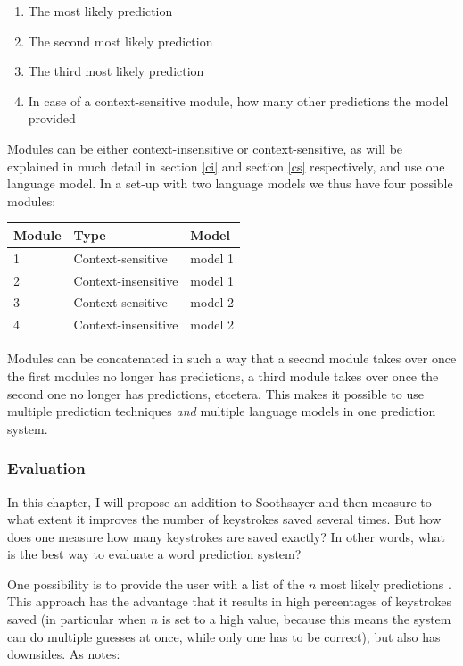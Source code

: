 \documentclass[12pt]{article}
\let\originaltable\table
\let\endoriginaltable\endtable
\renewenvironment{table}[1][ht]{%
  \originaltable[#1]
  \centering}%
  {\endoriginaltable}
\begin{document}
\begin{enumerate}
\item The most likely prediction
\item The second most likely prediction
\item The third most likely prediction
\item In case of a context-sensitive module, how many other predictions the model provided
\end{enumerate}

Modules can be either context-insensitive or context-sensitive, as will be explained in much detail in section \ref{ci} and section \ref{cs} respectively, and use one language model. In a set-up with two language models we thus have four possible modules:

\begin{table}[h]
\begin{tabular}{lll} 
Module&Type&Model\\
\hline
1&Context-sensitive&model 1\\
2&Context-insensitive&model 1\\
3&Context-sensitive&model 2\\
4&Context-insensitive&model 2\\
\end{tabular} 
\caption{A possible module set-up for Soothsayer}
\end{table}

Modules can be concatenated in such a way that a second module takes over once the first modules no longer has predictions, a third module takes over once the second one no longer has predictions, etcetera. This makes it possible to use multiple prediction techniques \emph{and} multiple language models in one prediction system.

\subsubsection{Evaluation}
In this chapter, I will propose an addition to Soothsayer and then measure to what extent it improves the number of keystrokes saved several times. But how does one measure how many keystrokes are saved exactly? In other words, what is the best way to evaluate a word prediction system?

One possibility is to provide the user with a list of the $n$ most likely predictions \cite{Lesher+99,Fazly+03}. This approach has the advantage that it results in high percentages of keystrokes saved (in particular when $n$ is set to a high value, because this means the system can do multiple guesses at once, while only one has to be correct), but also has downsides. As  notes: 
\end{document}

